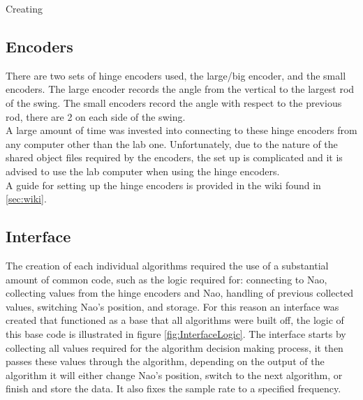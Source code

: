 \documentclass[11pt]{article}
\newcommand*\ruleline[1]{\par\noindent\raisebox{.8ex}{\makebox[\linewidth]{\hrulefill\hspace{1ex}\raisebox{-.8ex}{#1}\hspace{1ex}\hrulefill}}}
\begin{document}
Creating 

\subsection{Encoders}
\ruleline{George Sheppard}
There are two sets of hinge encoders used, the large/big encoder, and the small encoders. The large encoder records the angle from the vertical to the largest rod of the swing. The small encoders record the angle with respect to the previous rod, there are 2 on each side of the swing.\\

A large amount of time was invested into connecting to these hinge encoders from any computer other than the lab one. Unfortunately, due to the nature of the shared object files required by the encoders, the set up is complicated and it is advised to use the lab computer when using the hinge encoders.\\

A guide for setting up the hinge encoders is provided in the wiki found in \ref{sec:wiki}.

\subsection{Interface}\label{sec:Interface}
The creation of each individual algorithms required the use of a substantial amount of common code, such as the logic required for: connecting to Nao, collecting values from the hinge encoders and Nao, handling of previous collected values, switching Nao's position, and storage. For this reason an interface was created that functioned as a base that all algorithms were built off, the logic of this base code is illustrated in figure \ref{fig:InterfaceLogic}. The interface starts by collecting all values required for the algorithm decision making process, it then passes these values through the algorithm, depending on the output of the algorithm it will either change Nao's position, switch to the next algorithm, or finish and store the data. It also fixes the sample rate to a specified frequency.\\
\end{document}

